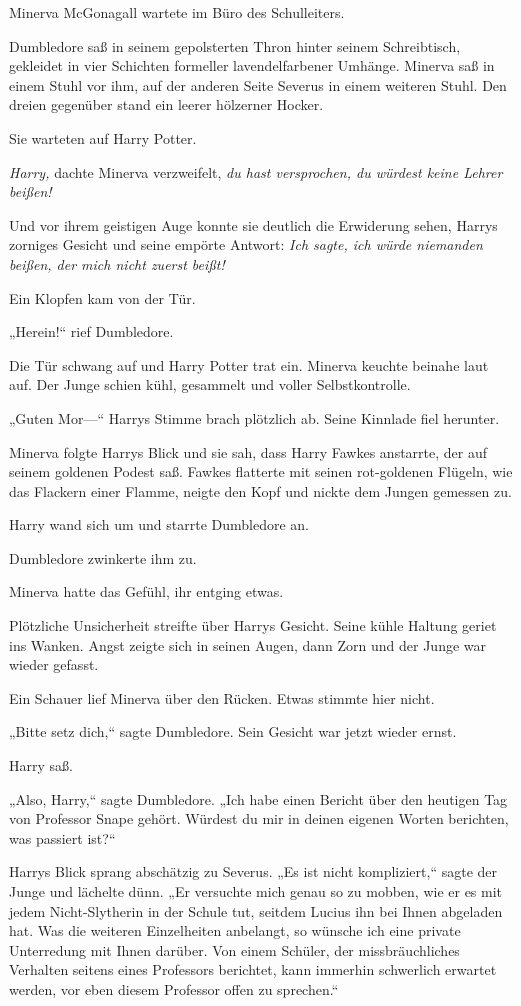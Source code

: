 {\later

Minerva McGonagall wartete im Büro des Schulleiters.

Dumbledore saß in seinem gepolsterten Thron hinter seinem Schreibtisch, gekleidet in vier Schichten formeller lavendelfarbener Umhänge. Minerva saß in einem Stuhl vor ihm, auf der anderen Seite Severus in einem weiteren Stuhl. Den dreien gegenüber stand ein leerer hölzerner Hocker.

Sie warteten auf Harry Potter.

\emph{Harry,} dachte Minerva verzweifelt, \emph{du hast versprochen, du würdest keine Lehrer beißen!}

Und vor ihrem geistigen Auge konnte sie deutlich die Erwiderung sehen, Harrys zorniges Gesicht und seine empörte Antwort: \emph{Ich sagte, ich würde niemanden beißen, der mich nicht zuerst beißt!}

Ein Klopfen kam von der Tür.

„Herein!“ rief Dumbledore.

Die Tür schwang auf und Harry Potter trat ein. Minerva keuchte beinahe laut auf. Der Junge schien kühl, gesammelt und voller Selbstkontrolle.

„Guten Mor—“ Harrys Stimme brach plötzlich ab. Seine Kinnlade fiel herunter.

Minerva folgte Harrys Blick und sie sah, dass Harry Fawkes anstarrte, der auf seinem goldenen Podest saß. Fawkes flatterte mit seinen rot-goldenen Flügeln, wie das Flackern einer Flamme, neigte den Kopf und nickte dem Jungen gemessen zu.

Harry wand sich um und starrte Dumbledore an.

Dumbledore zwinkerte ihm zu.

Minerva hatte das Gefühl, ihr entging etwas.

Plötzliche Unsicherheit streifte über Harrys Gesicht. Seine kühle Haltung geriet ins Wanken. Angst zeigte sich in seinen Augen, dann Zorn und der Junge war wieder gefasst.

Ein Schauer lief Minerva über den Rücken. Etwas stimmte hier nicht.

„Bitte setz dich,“ sagte Dumbledore. Sein Gesicht war jetzt wieder ernst.

Harry saß.

„Also, Harry,“ sagte Dumbledore. „Ich habe einen Bericht über den heutigen Tag von Professor Snape gehört. Würdest du mir in deinen eigenen Worten berichten, was passiert ist?“

Harrys Blick sprang abschätzig zu Severus. „Es ist nicht kompliziert,“ sagte der Junge und lächelte dünn. „Er versuchte mich genau so zu mobben, wie er es mit jedem Nicht-Slytherin in der Schule tut, seitdem Lucius ihn bei Ihnen abgeladen hat. Was die weiteren Einzelheiten anbelangt, so wünsche ich eine private Unterredung mit Ihnen darüber. Von einem Schüler, der missbräuchliches Verhalten seitens eines Professors berichtet, kann immerhin schwerlich erwartet werden, vor eben diesem Professor offen zu sprechen.“

}

